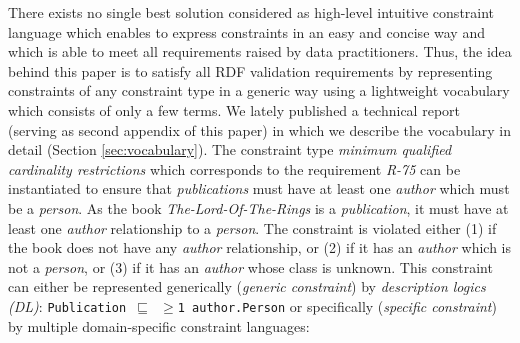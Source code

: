 \documentclass[a4paper,fontsize=11pt]{scrartcl}
\newcommand{\ms}[1]{\texttt{#1}}
\begin{document}
There exists no single best solution considered as high-level intuitive constraint language which enables to express constraints in an easy and concise way and which is able to meet all requirements raised by data practitioners.
Thus, the idea behind this paper is to satisfy all RDF validation requirements
by representing constraints of any constraint type in a generic way using a lightweight vocabulary which consists of only a few terms.
We lately published a technical report (serving as second appendix of this paper) in which we describe the vocabulary in detail \cite{BoschEckert2015-2} (Section \ref{sec:vocabulary}).
The constraint type \emph{minimum qualified cardinality restrictions} which corresponds to the requirement \emph{R-75} can be instantiated to ensure
that \emph{publications} must have at least one \emph{author} which must be a \emph{person}.
As the book \emph{The-Lord-Of-The-Rings} is a \emph{publication}, 
it must have at least one \emph{author} relationship to a \emph{person}.
The constraint is violated either (1) if
the book does not have any \emph{author} relationship, 
or (2) if it has an \emph{author} which is not a \emph{person},
or (3) if it has an \emph{author} whose class is unknown.
This constraint can either be represented generically (\emph{generic constraint}) by \emph{description logics (DL)}: {\small\ms{Publication $\sqsubseteq$ $\geq$1 author.Person}} or specifically (\emph{specific constraint}) by multiple domain-specific constraint languages:
\end{document}
